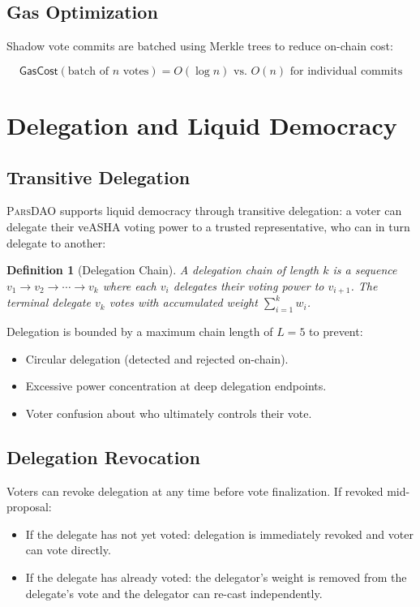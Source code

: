 \documentclass[11pt,a4paper]{article}
\newcommand{\parsdao}{\textsc{ParsDAO}\xspace}
\newtheorem{definition}{Definition}
\begin{document}
\subsection{Gas Optimization}

Shadow vote commits are batched using Merkle trees to reduce on-chain cost:

\begin{equation}
    \mathsf{GasCost}(\text{batch of } n \text{ votes}) = O(\log n) \text{ vs. } O(n) \text{ for individual commits}
\end{equation}

\section{Delegation and Liquid Democracy}

\subsection{Transitive Delegation}

\parsdao supports liquid democracy through transitive delegation: a voter can delegate their veASHA voting power to a trusted representative, who can in turn delegate to another:

\begin{definition}[Delegation Chain]
A delegation chain of length $k$ is a sequence $v_1 \rightarrow v_2 \rightarrow \cdots \rightarrow v_k$ where each $v_i$ delegates their voting power to $v_{i+1}$. The terminal delegate $v_k$ votes with accumulated weight $\sum_{i=1}^{k} w_i$.
\end{definition}

Delegation is bounded by a maximum chain length of $L = 5$ to prevent:
\begin{itemize}
    \item Circular delegation (detected and rejected on-chain).
    \item Excessive power concentration at deep delegation endpoints.
    \item Voter confusion about who ultimately controls their vote.
\end{itemize}

\subsection{Delegation Revocation}

Voters can revoke delegation at any time before vote finalization. If revoked mid-proposal:
\begin{itemize}
    \item If the delegate has not yet voted: delegation is immediately revoked and voter can vote directly.
    \item If the delegate has already voted: the delegator's weight is removed from the delegate's vote and the delegator can re-cast independently.
\end{itemize}
\end{document}
